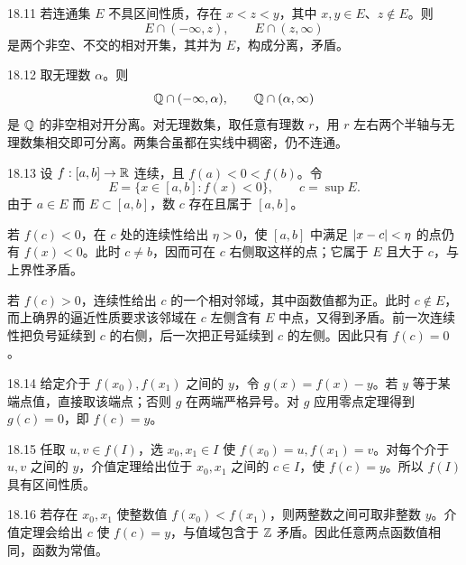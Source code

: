 \begin{solution}{18.11}
若连通集 \(E\) 不具区间性质，存在 \(x<z<y\)，其中 \(x,y\in E\)、\(z\notin E\)。则
\[
 E\cap(-\infty,z),\qquad E\cap(z,\infty)
\]
是两个非空、不交的相对开集，其并为 \(E\)，构成分离，矛盾。
\end{solution}

\begin{solution}{18.12}
取无理数 \(\alpha\)。则
\[
 \mathbb{Q}\cap(-\infty,\alpha),\qquad \mathbb{Q}\cap(\alpha,\infty)
\]
是 \(\mathbb{Q}\) 的非空相对开分离。对无理数集，取任意有理数 \(r\)，用 \(r\) 左右两个半轴与无理数集相交即可分离。两集合虽都在实线中稠密，仍不连通。
\end{solution}

\begin{solution}{18.13}
设 \(f:[a,b]\to\mathbb{R}\) 连续，且 \(f(a)<0<f(b)\)。令
\[
 E=\{x\in[a,b]:f(x)<0\},
 \qquad c=\sup E.
\]
由于 \(a\in E\) 而 \(E\subset[a,b]\)，数 \(c\) 存在且属于 \([a,b]\)。

若 \(f(c)<0\)，在 \(c\) 处的连续性给出 \(\eta>0\)，使 \([a,b]\) 中满足 \(\left|x-c\right|<\eta\) 的点仍有 \(f(x)<0\)。此时 \(c\ne b\)，因而可在 \(c\) 右侧取这样的点；它属于 \(E\) 且大于 \(c\)，与上界性矛盾。

若 \(f(c)>0\)，连续性给出 \(c\) 的一个相对邻域，其中函数值都为正。此时 \(c\notin E\)，而上确界的逼近性质要求该邻域在 \(c\) 左侧含有 \(E\) 中点，又得到矛盾。前一次连续性把负号延续到 \(c\) 的右侧，后一次把正号延续到 \(c\) 的左侧。因此只有 \(f(c)=0\)。
\end{solution}

\begin{solution}{18.14}
给定介于 \(f(x_0),f(x_1)\) 之间的 \(y\)，令 \(g(x)=f(x)-y\)。若 \(y\) 等于某端点值，直接取该端点；否则 \(g\) 在两端严格异号。对 \(g\) 应用零点定理得到 \(g(c)=0\)，即 \(f(c)=y\)。
\end{solution}

\begin{solution}{18.15}
任取 \(u,v\in f(I)\)，选 \(x_0,x_1\in I\) 使 \(f(x_0)=u,f(x_1)=v\)。对每个介于 \(u,v\) 之间的 \(y\)，介值定理给出位于 \(x_0,x_1\) 之间的 \(c\in I\)，使 \(f(c)=y\)。所以 \(f(I)\) 具有区间性质。
\end{solution}

\begin{solution}{18.16}
若存在 \(x_0,x_1\) 使整数值 \(f(x_0)<f(x_1)\)，则两整数之间可取非整数 \(y\)。介值定理会给出 \(c\) 使 \(f(c)=y\)，与值域包含于 \(\mathbb{Z}\) 矛盾。因此任意两点函数值相同，函数为常值。
\end{solution}

